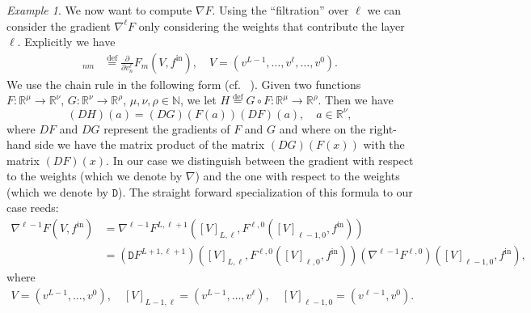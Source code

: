 \documentclass[10pt, a4paper]{article}
\theoremstyle{plain}
\theoremstyle{definition}
\theoremstyle{definition}
\theoremstyle{definition}
\theoremstyle{definition}
\theoremstyle{definition}
\theoremstyle{definition}
\theoremstyle{definition}
\theoremstyle{remark}
\theoremstyle{remark}
\newtheorem{example}[theorem]{Example}
\theoremstyle{rudin-style-generic}
\theoremstyle{rudin-style-generic*}
\theoremstyle{rudin-style-theorem}
\newcommand{\deq}{\stackrel{\mathrm{def}}{=}}
\newcommand{\NN}{\mathbb N}
\newcommand{\RR}{\mathbb R}
\newcommand*{\fin}{{f^{\text{in}}}}
\begin{document}
\begin{example}
  
  We now want to compute $\nabla F$.
  Using the ``filtration'' over $\ell$ we can consider the gradient $\nabla^\ell F$ only considering the weights that
  contribute the layer $\ell$.
  Explicitly we have
  \begin{align*}
    [\nabla^\ell F(V,\fin)]_{nm}
    &\deq  \frac{\partial}{\partial v^\ell_n} F_m(V,\fin),
      \quad V=(v^{L-1},\dots, v^\ell,\dots, v^0)
      .
  \end{align*}
  We use the chain rule in the following form (cf.~ \cite[(1.4) p. 23, and (2.3) Theorem]{boothbyIntroductionDifferentiableManifolds2003}).
  Given two functions $F:\RR^\mu\rightarrow\RR^\nu$, $G:\RR^\nu\rightarrow \RR^\rho $, $\mu,\nu,\rho\in\NN$, we let
  $H\deq G\circ F:\RR^\mu\rightarrow\RR^\rho$.
  Then we have
  \begin{equation}
    \label{eq:5}
    (DH)( a ) = (DG)( F(a) ) (DF)(a), \quad a\in\RR^\nu
    ,
  \end{equation}
  where $DF$ and $DG$ represent the gradients of $F$ and $G$ 
  and
  where on the right-hand side we have the matrix product of the matrix $(DG)( F(x) )$ with the matrix $(DF)(x)$.
  In our case we distinguish between the gradient with respect to the weights (which we denote by $\nabla$)
  and the one with respect to the weights (which we denote by $\mathtt D$).
  The straight forward specialization of this formula to our case reeds:
  \begin{equation}\label{eq:4}
    \begin{aligned}
      \nabla^{\ell-1} F(V,\fin)
      &= \nabla^{\ell-1} F^{L,\ell+1}([V]_{L,\ell}, F^{\ell,0}([V]_{\ell-1,0} , \fin ) ) \\
      &= (\mathtt D F^{L+1,\ell+1})([V]_{L,\ell}, F^{\ell,0}([V]_{\ell,0}, \fin ) ) (\nabla^{\ell-1}  F^{\ell,0})([V]_{\ell-1,0} , \fin )
        ,
    \end{aligned}
  \end{equation}
  where       
  \begin{align*}
    V = (v^{L-1},\dots, v^0),\quad [V]_{L-1,\ell} =(v^{L-1},\dots, v^{\ell}),\quad [V]_{\ell-1,0}=(v^{\ell-1},v^0)
    .
  \end{align*}
  

\end{example}
\end{document}
